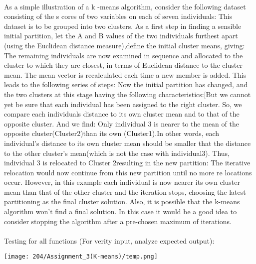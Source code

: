 \documentclass[11pt]{article}
\begin{document}
	\paragraph{}
	As a simple illustration of a k -means algorithm, consider the following dataset consisting of the
	s cores of two variables on each of seven individuals: This dataset is to be grouped into two
	clusters. As a first step in finding a sensible initial partition, let
	the A and B values of the two individuals furthest apart (using the Euclidean distance
	measure),define the initial cluster means, giving:
	The remaining individuals are now examined in sequence
	and allocated to the cluster to which they are closest, in terms of Euclidean distance to the cluster
	mean. The mean vector is recalculated each time a new member is added. This leads to the
	following series of steps: Now the initial partition has changed, and the two clusters at this stage
	having the following characteristics:[But we cannot yet be sure that each individual has been
	assigned to the right cluster. So, we compare each individuals distance to its own cluster mean
	and to that of the opposite cluster. And we find: Only individual 3 is nearer to the mean of the
	opposite cluster(Cluster2)than its own (Cluster1).In other words, each individual’s distance to its
	own cluster mean should be smaller that the distance to the other cluster’s mean(which is not the
	case with individual3). Thus, individual 3 is relocated to Cluster 2resulting in the new partition:
	The iterative relocation would now continue from this new partition until no more re locations
	occur. However, in this example each individual is now nearer its own cluster mean than that of
	the other cluster and the iteration stops, choosing the latest partitioning as the final cluster
	solution. Also, it is possible that the k-means algorithm won’t find a final solution. In this case it
	would be a good idea to consider stopping the algorithm after a pre-chosen maximum of
	iterations.\\ \\
	Testing for all functions (For verity input, analyze expected output): 
	
	\texttt{[image: 204/Assignment\_3(K-means)/temp.png]}\\
	
\end{document}
